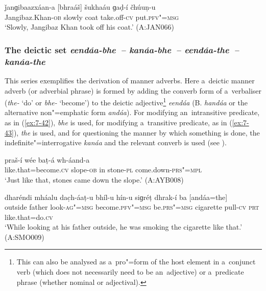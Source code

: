 \begin{exe}
\ex
\label{ex:7-41}
\gll ǰanɡibaazxáan-a [bhraáš] šukhaáu ɡaḍ-í čhúuṇ-u \\
Jangibaz.Khan-\textsc{ob} slowly coat take.off-\textsc{cv} put.\textsc{pfv"=msg}  \\
\glt `Slowly, Jangibaz Khan took off his coat.' (A:JAN066)
\end{exe}

\subsubsection*{The deictic set \textit{eendáa-bhe~-- kanáa-bhe~-- eendáa-the~--
    kanáa-the}} %

This series exemplifies the derivation of manner adverbs. Here a~deictic manner adverb (or adverbial phrase) is formed by adding the converb form of a~verbaliser (\textit{the-} `do' or \textit{bhe-}
`become') to the deictic adjective\footnote{This can also be analysed as a~pro"=form of the host
  element in a~conjunct verb (which does not necessarily need to be an~adjective) or a~predicate
  phrase (whether nominal or adjectival).} \textit{eendáa} (B. \textit{handáa} or the alternative
non"=emphatic form \textit{andáa}). For modifying an~intransitive predicate, as in (\ref{ex:7-42}),
\textit{bhe} is used, for modifying a~transitive predicate, as in (\ref{ex:7-43}), \textit{the} is
used, and for questioning the manner by which something is done, the indefinite"=interrogative
\textit{kanáa} and the relevant converb is used (see ).

\begin{exe}
\ex
\label{ex:7-42}
\gll [andáa=bhe] praš-í wée baṭ-á wh-áand-a \\
like.that=become.\textsc{cv} slope-\textsc{ob} in stone-\textsc{pl} come.down-\textsc{prs"=mpl} \\
\glt `Just like that, stones came down the slope.' (A:AYB008)
\end{exe}
\begin{exe}
\ex
\label{ex:7-43}
\gll dharéndi mháalu dac̣h-áaṭ-u bhíl-u hín-u  siɡréṭ dhrak-í ba [andáa=the] \\
outside father look-\textsc{ag"=msg} become.\textsc{pfv"=msg} be.\textsc{prs"=msg} cigarette pull-\textsc{cv} \textsc{prt} like.that=do.\textsc{cv}  \\
\glt `While looking at his father outside, he was smoking the cigarette like that.' (A:SMO009)
\end{exe}

